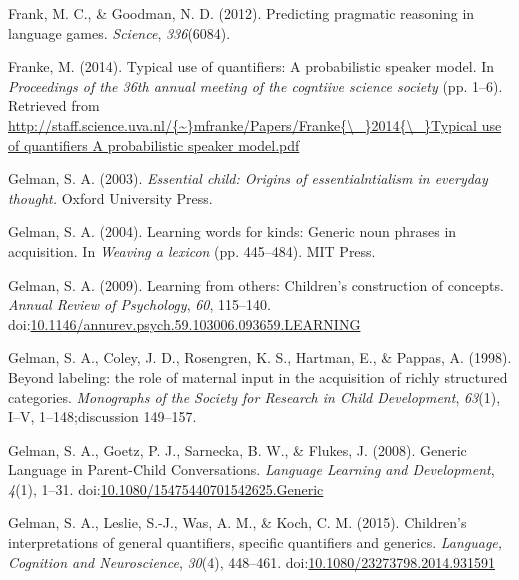 \documentclass[english,,man,floatsintext]{apa6}
\theoremstyle{definition}
\theoremstyle{definition}
\theoremstyle{definition}
\theoremstyle{remark}
\begin{document}
\leavevmode\hypertarget{ref-Frank2012}{}%
Frank, M. C., \& Goodman, N. D. (2012). Predicting pragmatic reasoning
in language games. \emph{Science}, \emph{336}(6084).

\leavevmode\hypertarget{ref-Franke2014cogsci}{}%
Franke, M. (2014). Typical use of quantifiers: A probabilistic speaker
model. In \emph{Proceedings of the 36th annual meeting of the cogntiive
science society} (pp. 1--6). Retrieved from
\href{http://staff.science.uva.nl/\%7B~\%7Dmfranke/Papers/Franke\%7B/_\%7D2014\%7B/_\%7DTypical\%20use\%20of\%20quantifiers\%20A\%20probabilistic\%20speaker\%20model.pdf}{http://staff.science.uva.nl/\{\textasciitilde{}\}mfranke/Papers/Franke\{\textbackslash{}\_\}2014\{\textbackslash{}\_\}Typical use of quantifiers A probabilistic speaker model.pdf}

\leavevmode\hypertarget{ref-Gelman2003}{}%
Gelman, S. A. (2003). \emph{Essential child: Origins of
essentialntialism in everyday thought.} Oxford University Press.

\leavevmode\hypertarget{ref-Gelman2004}{}%
Gelman, S. A. (2004). Learning words for kinds: Generic noun phrases in
acquisition. In \emph{Weaving a lexicon} (pp. 445--484). MIT Press.

\leavevmode\hypertarget{ref-Gelman2009}{}%
Gelman, S. A. (2009). Learning from others: Children's construction of
concepts. \emph{Annual Review of Psychology}, \emph{60}, 115--140.
doi:\href{https://doi.org/10.1146/annurev.psych.59.103006.093659.LEARNING}{10.1146/annurev.psych.59.103006.093659.LEARNING}

\leavevmode\hypertarget{ref-Gelman1998}{}%
Gelman, S. A., Coley, J. D., Rosengren, K. S., Hartman, E., \& Pappas,
A. (1998). Beyond labeling: the role of maternal input in the
acquisition of richly structured categories. \emph{Monographs of the
Society for Research in Child Development}, \emph{63}(1), I--V,
1--148;discussion 149--157.

\leavevmode\hypertarget{ref-Gelman2008}{}%
Gelman, S. A., Goetz, P. J., Sarnecka, B. W., \& Flukes, J. (2008).
Generic Language in Parent-Child Conversations. \emph{Language Learning
and Development}, \emph{4}(1), 1--31.
doi:\href{https://doi.org/10.1080/15475440701542625.Generic}{10.1080/15475440701542625.Generic}

\leavevmode\hypertarget{ref-Gelman2015}{}%
Gelman, S. A., Leslie, S.-J., Was, A. M., \& Koch, C. M. (2015).
Children's interpretations of general quantifiers, specific quantifiers
and generics. \emph{Language, Cognition and Neuroscience}, \emph{30}(4),
448--461.
doi:\href{https://doi.org/10.1080/23273798.2014.931591}{10.1080/23273798.2014.931591}
\end{document}
